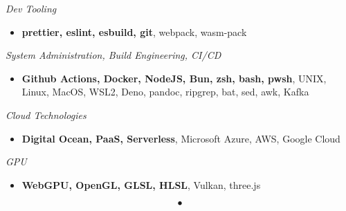 \documentclass[10pt]{
	res
} %
\begin{document}
\begin{resume}
		\vspace{4pt}
		{\sl Dev Tooling}
		\begin{itemize}
			\item[] \textbf{prettier, eslint, esbuild, git}, webpack, wasm-pack
		\end{itemize}

		\vspace{4pt}
		{\sl System Administration, Build Engineering, CI/CD}
		\begin{itemize}
			\item[] \textbf{Github Actions, Docker, NodeJS, Bun, zsh, bash, pwsh}, UNIX,
				Linux, MacOS, WSL2, Deno, pandoc, ripgrep, bat, sed, awk, Kafka
		\end{itemize}

		\vspace{4pt}
		{\sl Cloud Technologies}
		\begin{itemize}
			\item[] \textbf{Digital Ocean, PaaS, Serverless}, Microsoft Azure, AWS, Google
				Cloud
		\end{itemize}

		\vspace{4pt}
		{\sl GPU}
		\begin{itemize}
			\item[] \textbf{WebGPU, OpenGL, GLSL, HLSL}, Vulkan, three.js
		\end{itemize}

		\[
			\bullet
		\]
	\end{resume}
\end{document}
